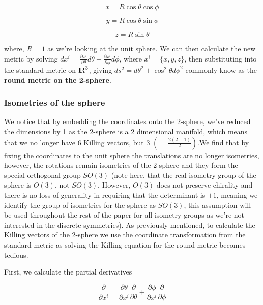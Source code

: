 \documentclass[a4paper,11pt]{article}
\numberwithin{equation}{section}
\numberwithin{figure}{section}
\begin{document}
\begin{large}
\begin{equation}
\label{eq:xpol}
    x=R\cos\theta\cos\phi 
\end{equation}

\begin{equation}
\label{eq:ypol}
    y=R\cos\theta\sin\phi 
\end{equation}

\begin{equation}
\label{eq:zpol}
    z=R\sin\theta
\end{equation}


where, $R=1$ as we're looking at the unit sphere. We can then calculate the new metric by solving $dx^i=\frac{\partial x^i}{\partial \theta}d\theta+\frac{\partial x^i}{\partial \phi}d\phi$, where $x^i=\{x,y,z\}$, then substituting into the standard metric on ${\rm I\!R}^3$, giving $ds^2=d\theta^2+\cos^2\theta d\phi^2$ commonly know as the \textbf{round metric on the 2-sphere}. 


\subsubsection{Isometries of the sphere}


We notice that by embedding the coordinates onto the 2-sphere, we've reduced the dimensions by 1 as the 2-sphere is a 2 dimensional manifold, which means that we no longer have 6 Killing vectors, but $3$ $\left(=\frac{2(2+1)}{2}\right)$.We find that by fixing the coordinates to the unit sphere the translations are no longer isometries, however, the rotations remain isometries of the 2-sphere and they form the special orthogonal group $SO(3)$ (note here, that the real isometry group of the sphere is $O(3)$, not $SO(3)$. However, $O(3)$ does not preserve chirality and there is no loss of generality in requiring that the determinant is $+1$, meaning we identify the group of isometries for the sphere as $SO(3)$, this assumption will be used throughout the rest of the paper for all isometry groups as we're not interested in the discrete symmetries). As previously mentioned, to calculate the Killing vectors of the 2-sphere we use the coordinate transformation from the standard metric as solving the Killing equation for the round metric becomes tedious. 

First, we calculate the partial derivatives

\begin{equation}
\label{eq:part}
    \frac{\partial}{\partial x^i}=\frac{\partial \theta}{\partial x^i}\frac{\partial}{\partial \theta}+\frac{\partial \phi}{\partial x^i}\frac{\partial}{\partial \phi}
\end{equation}


\end{large}
\end{document}
